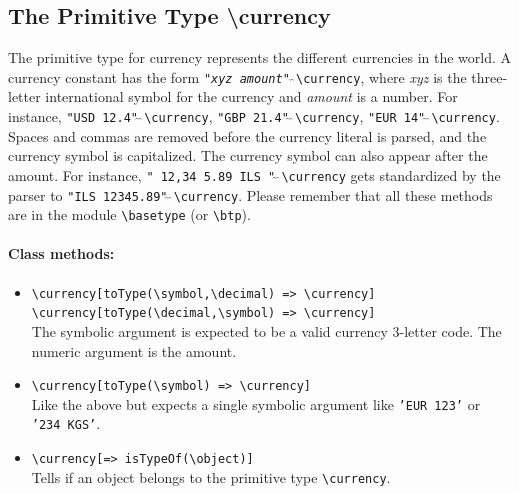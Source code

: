 \documentclass[11pt]{article}
\newcommand{\bs}{\textbackslash}
\begin{document}
\subsection{ The Primitive Type \bs{}currency}

\index{datatype!\bs{}currency}
The primitive type for currency represents the different currencies in the
world. A currency constant has the form
\texttt{"\textnormal{\emph{xyz amount}}"$\hat{~}\hat{~}$\bs{}currency}, where \emph{xyz} is the
three-letter international symbol for the currency and \emph{amount} is a
number. For instance, \texttt{"USD 12.4"$\hat{~}\hat{~}$\bs{}currency},
\texttt{"GBP 21.4"$\hat{~}\hat{~}$\bs{}currency},
\texttt{"EUR 14"$\hat{~}\hat{~}$\bs{}currency}. Spaces and commas are
removed before the currency literal is parsed,
and the currency symbol is capitalized. The currency symbol can
also appear after the amount. For instance,
\texttt{" 12,34 5.89 ILS "$\hat{~}\hat{~}$\bs{}currency}
gets standardized by the parser to
\texttt{"ILS 12345.89"$\hat{~}\hat{~}$\bs{}currency}.
Please remember that all these methods are in the module
\texttt{\bs{}basetype} (or \texttt{\bs{}btp}).

\paragraph{Class methods:}
\begin{itemize}
\item {\tt \bs{}currency[toType(\bs{}symbol,\bs{}decimal) => \bs{}currency]}
  \\
{\tt \bs{}currency[toType(\bs{}decimal,\bs{}symbol) => \bs{}currency]}
  \\
  The symbolic argument is expected to be a valid currency 3-letter
  code. The numeric argument is the amount.
\item
  {\tt \bs{}currency[toType(\bs{}symbol) => \bs{}currency]}
  \\
  Like the above but expects a single symbolic argument
  like \texttt{'EUR 123'} or \texttt{'234 KGS'}.
\item
  {\tt \bs{}currency[=> isTypeOf(\bs{}object)]}
  \\
  Tells if an object belongs to the primitive type {\tt \bs{}currency}.  
\end{itemize}
\end{document}
